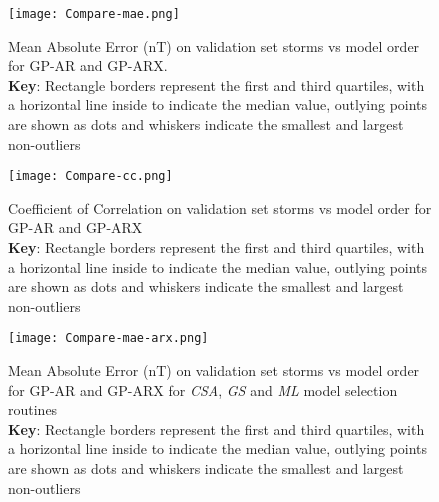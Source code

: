 %


\begin{figure}
    \noindent\texttt{[image: Compare-mae.png]}
    \caption{Mean Absolute Error (\si{\nano\tesla}) on validation set storms vs model order for GP-AR and GP-ARX. \\ \textbf{Key}: Rectangle borders represent the first and third quartiles, with a horizontal line inside to indicate the median value, outlying points are shown as dots and whiskers indicate the smallest and largest non-outliers}
    \label{fig:CompareMae}
    \end{figure}
    
    \begin{figure}
    \noindent\texttt{[image: Compare-cc.png]}
    \caption{Coefficient of Correlation on validation set storms vs model order for GP-AR and GP-ARX \\ \textbf{Key}: Rectangle borders represent the first and third quartiles, with a horizontal line inside to indicate the median value, outlying points are shown as dots and whiskers indicate the smallest and largest non-outliers}
    \label{fig:CompareCC}
    \end{figure}
    
    
    \begin{figure}
    \noindent\texttt{[image: Compare-mae-arx.png]}
    \caption{Mean Absolute Error (\si{\nano\tesla}) on validation set storms vs model order for GP-AR and GP-ARX for \emph{CSA}, \emph{GS} and \emph{ML} model selection routines \\ \textbf{Key}: Rectangle borders represent the first and third quartiles, with a horizontal line inside to indicate the median value, outlying points are shown as dots and whiskers indicate the smallest and largest non-outliers}
    \label{fig:CompareMaeARX}
    \end{figure}
    

